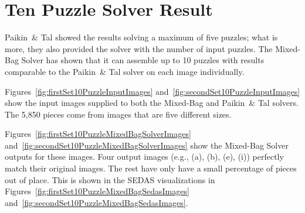 \chapter{Ten Puzzle Solver Result}

Paikin~\& Tal \cite{paikin2015} showed the results solving a maximum of five puzzles; what is more, they also provided the solver with the number of input puzzles.  The Mixed-Bag Solver has shown that it can assemble up to 10 puzzles with results comparable to the Paikin~\& Tal solver on each image individually.

Figures~\ref{fig:firstSet10PuzzleInputImages} and~\ref{fig:secondSet10PuzzleInputImages} show the input images supplied to both the Mixed-Bag and Paikin~\& Tal solvers. The 5,850 pieces come from images that are five different sizes.

Figures~\ref{fig:firstSet10PuzzleMixedBagSolverImages} and~\ref{fig:secondSet10PuzzleMixedBagSolverImages} show the Mixed-Bag Solver outputs for these images.  Four output images (e.g., (a), (b), (e), (i)) perfectly match their original images.  The rest have only have a small percentage of pieces out of place.  This is shown in the SEDAS visualizations in Figures~\ref{fig:firstSet10PuzzleMixedBagSedasImages} and~\ref{fig:secondSet10PuzzleMixedBagSedasImages}.

